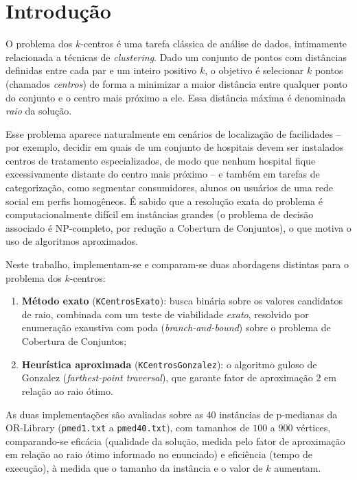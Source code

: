 \documentclass[10pt,twocolumn]{article}
\begin{document}
\section{Introdu\c{c}\~ao}

O problema dos $k$-centros \'e uma tarefa cl\'assica de an\'alise de dados, intimamente
relacionada a t\'ecnicas de \emph{clustering}. Dado um conjunto de pontos com dist\^ancias
definidas entre cada par e um inteiro positivo $k$, o objetivo \'e selecionar $k$ pontos
(chamados \emph{centros}) de forma a minimizar a maior dist\^ancia entre qualquer ponto do
conjunto e o centro mais pr\'oximo a ele. Essa dist\^ancia m\'axima \'e denominada
\emph{raio} da solu\c{c}\~ao.

Esse problema aparece naturalmente em cen\'arios de localiza\c{c}\~ao de facilidades --
por exemplo, decidir em quais de um conjunto de hospitais devem ser instalados centros de
tratamento especializados, de modo que nenhum hospital fique excessivamente distante do
centro mais pr\'oximo -- e tamb\'em em tarefas de categoriza\c{c}\~ao, como segmentar
consumidores, alunos ou usu\'arios de uma rede social em perfis homog\^eneos. \'E
sabido que a resolu\c{c}\~ao exata do problema \'e computacionalmente dif\'icil em
inst\^ancias grandes (o problema de decis\~ao associado \'e $\mathrm{NP}$-completo, por
redu\c{c}\~ao a Cobertura de Conjuntos), o que motiva o uso de algoritmos aproximados.

Neste trabalho, implementam-se e comparam-se duas abordagens distintas para o problema dos
$k$-centros:

\begin{enumerate}[leftmargin=1.3em,itemsep=1pt]
  \item \textbf{M\'etodo exato} (\texttt{KCentrosExato}): busca bin\'aria sobre os
  valores candidatos de raio, combinada com um teste de viabilidade \emph{exato},
  resolvido por enumera\c{c}\~ao exaustiva com poda (\emph{branch-and-bound}) sobre o
  problema de Cobertura de Conjuntos;
  \item \textbf{Heur\'istica aproximada} (\texttt{KCentrosGonzalez}): o algoritmo guloso
  de Gonzalez (\emph{farthest-point traversal}), que garante fator de aproxima\c{c}\~ao
  $2$ em rela\c{c}\~ao ao raio \'otimo.
\end{enumerate}

As duas implementa\c{c}\~oes s\~ao avaliadas sobre as 40 inst\^ancias de p-medianas da
OR-Library (\texttt{pmed1.txt} a \texttt{pmed40.txt}), com tamanhos de $100$ a $900$
v\'ertices, comparando-se efic\'acia (qualidade da solu\c{c}\~ao, medida pelo fator de
aproxima\c{c}\~ao em rela\c{c}\~ao ao raio \'otimo informado no enunciado) e efici\^encia
(tempo de execu\c{c}\~ao), \`a medida que o tamanho da inst\^ancia e o valor de $k$
aumentam.
\end{document}
